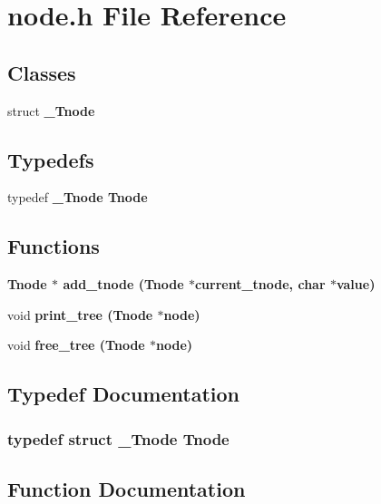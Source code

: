 \section{node.h File Reference}
\label{node_8h}
\subsection*{Classes}
\begin{CompactItemize}
\item 
struct \bf{\_\-Tnode}
\end{CompactItemize}
\subsection*{Typedefs}
\begin{CompactItemize}
\item 
typedef \bf{\_\-Tnode} \bf{Tnode}
\end{CompactItemize}
\subsection*{Functions}
\begin{CompactItemize}
\item 
\bf{Tnode} $\ast$ \bf{add\_\-tnode} (\bf{Tnode} $\ast$current\_\-tnode, char $\ast$value)
\item 
void \bf{print\_\-tree} (\bf{Tnode} $\ast$node)
\item 
void \bf{free\_\-tree} (\bf{Tnode} $\ast$node)
\end{CompactItemize}


\subsection{Typedef Documentation}
\subsubsection{\setlength{\rightskip}{0pt plus 5cm}typedef struct \bf{\_\-Tnode} \bf{Tnode}}\label{node_8h_0113664e9241bb4e9114718b5f9b9625}




\subsection{Function Documentation}
